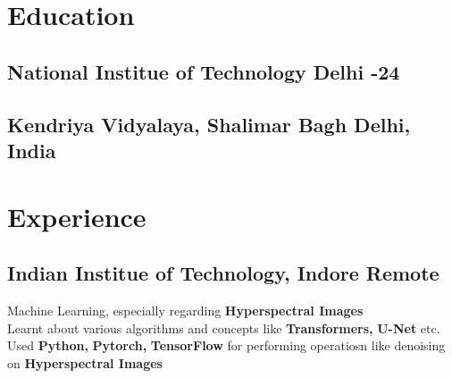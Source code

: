\documentclass[]{Nikhil_Kadiyan_Resume}
\begin{document}

\descript{}

\section{Education}
\hrulefill

\subsection{National Institue of Technology Delhi \hfill {}-24}

\sectionsep

\subsection{Kendriya Vidyalaya, Shalimar Bagh \hfill \normalfont Delhi, India}

\sectionsep

\section{Experience} 
\hrulefill 


\subsection{Indian Institue of Technology, Indore \hfill \normalfont Remote}
\pt Machine Learning, especially regarding \textbf{Hyperspectral Images}\\
\pt Learnt about various algorithms and concepts like \textbf{Transformers,} \textbf{U-Net} etc.\\
\pt Used \textbf{Python,} \textbf{Pytorch,} \textbf{TensorFlow} for performing operatiosn like denoising on \textbf{Hyperspectral Images}\\
\sectionsep
\end{document}

